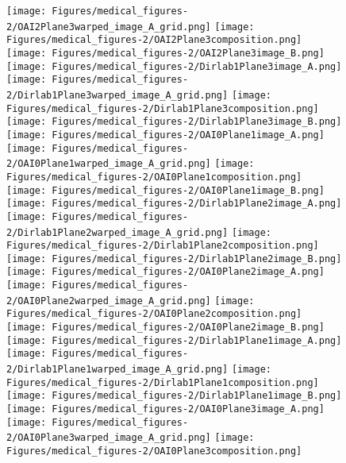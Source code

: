 \begin{figure}
{		\texttt{[image: Figures/medical\_figures-2/OAI2Plane3warped\_image\_A\_grid.png]}
		\texttt{[image: Figures/medical\_figures-2/OAI2Plane3composition.png]}
		\texttt{[image: Figures/medical\_figures-2/OAI2Plane3image\_B.png]}
        \\
		\texttt{[image: Figures/medical\_figures-2/Dirlab1Plane3image\_A.png]}
		\texttt{[image: Figures/medical\_figures-2/Dirlab1Plane3warped\_image\_A\_grid.png]}
		\texttt{[image: Figures/medical\_figures-2/Dirlab1Plane3composition.png]}
		\texttt{[image: Figures/medical\_figures-2/Dirlab1Plane3image\_B.png]}
		\texttt{[image: Figures/medical\_figures-2/OAI0Plane1image\_A.png]}
		\texttt{[image: Figures/medical\_figures-2/OAI0Plane1warped\_image\_A\_grid.png]}
		\texttt{[image: Figures/medical\_figures-2/OAI0Plane1composition.png]}
		\texttt{[image: Figures/medical\_figures-2/OAI0Plane1image\_B.png]}
	 	\\
		\texttt{[image: Figures/medical\_figures-2/Dirlab1Plane2image\_A.png]}
		\texttt{[image: Figures/medical\_figures-2/Dirlab1Plane2warped\_image\_A\_grid.png]}
		\texttt{[image: Figures/medical\_figures-2/Dirlab1Plane2composition.png]}
		\texttt{[image: Figures/medical\_figures-2/Dirlab1Plane2image\_B.png]}
		\texttt{[image: Figures/medical\_figures-2/OAI0Plane2image\_A.png]}
		\texttt{[image: Figures/medical\_figures-2/OAI0Plane2warped\_image\_A\_grid.png]}
		\texttt{[image: Figures/medical\_figures-2/OAI0Plane2composition.png]}
		\texttt{[image: Figures/medical\_figures-2/OAI0Plane2image\_B.png]}
        \\
		\texttt{[image: Figures/medical\_figures-2/Dirlab1Plane1image\_A.png]}
		\texttt{[image: Figures/medical\_figures-2/Dirlab1Plane1warped\_image\_A\_grid.png]}
		\texttt{[image: Figures/medical\_figures-2/Dirlab1Plane1composition.png]}
		\texttt{[image: Figures/medical\_figures-2/Dirlab1Plane1image\_B.png]}
		\texttt{[image: Figures/medical\_figures-2/OAI0Plane3image\_A.png]}
		\texttt{[image: Figures/medical\_figures-2/OAI0Plane3warped\_image\_A\_grid.png]}
		\texttt{[image: Figures/medical\_figures-2/OAI0Plane3composition.png]}
}
\end{figure}
